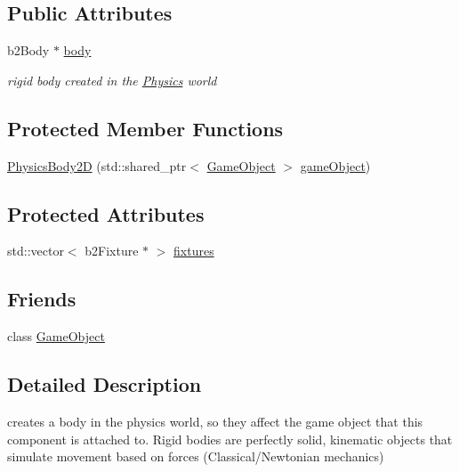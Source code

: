 \subsection*{Public Attributes}
\begin{DoxyCompactItemize}
\item 
b2\+Body $\ast$ \hyperlink{class_mason_1_1_physics_body2_d_abd02e269a86d5b760966a33eefa918d9}{body}
\begin{DoxyCompactList}\small\item\em rigid body created in the \hyperlink{class_mason_1_1_physics}{Physics} world \end{DoxyCompactList}\end{DoxyCompactItemize}
\subsection*{Protected Member Functions}
\begin{DoxyCompactItemize}
\item 
\hyperlink{class_mason_1_1_physics_body2_d_a70f168ce81ef424d8c7eac3f199f9c2b}{Physics\+Body2D} (std\+::shared\+\_\+ptr$<$ \hyperlink{class_mason_1_1_game_object}{Game\+Object} $>$ \hyperlink{class_mason_1_1_component_abaa67b569d0a70e26a4606f4a099a925}{game\+Object})
\end{DoxyCompactItemize}
\subsection*{Protected Attributes}
\begin{DoxyCompactItemize}
\item 
std\+::vector$<$ b2\+Fixture $\ast$ $>$ \hyperlink{class_mason_1_1_physics_body2_d_a73a0ad2e2b91022137c6ba8abe1fb51b}{fixtures}
\end{DoxyCompactItemize}
\subsection*{Friends}
\begin{DoxyCompactItemize}
\item 
class \hyperlink{class_mason_1_1_physics_body2_d_a00df87c957d8f7ee0fc51f07a0542f4a}{Game\+Object}
\end{DoxyCompactItemize}


\subsection{Detailed Description}
creates a body in the physics world, so they affect the game object that this component is attached to. Rigid bodies are perfectly solid, kinematic objects that simulate movement based on forces (Classical/\+Newtonian mechanics) 


